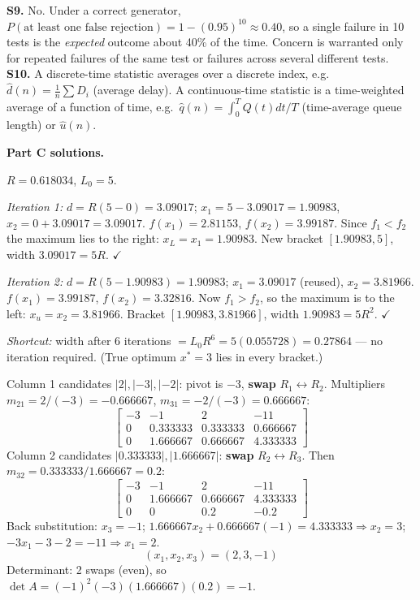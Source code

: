 \begin{qabox}
\textbf{S9.} No. Under a correct generator, $P(\text{at least one false rejection}) = 1-(0.95)^{10} \approx 0.40$, so a single failure in 10 tests is the \emph{expected} outcome about 40\% of the time. Concern is warranted only for repeated failures of the same test or failures across several different tests.\\
\textbf{S10.} A discrete-time statistic averages over a discrete index, e.g.\ $\hat d(n)=\frac1n\sum D_i$ (average delay). A continuous-time statistic is a time-weighted average of a function of time, e.g.\ $\hat q(n)=\int_0^T Q(t)dt / T$ (time-average queue length) or $\hat u(n)$.
\end{qabox}

\begin{probbox}
\textbf{Part C solutions.}

 $R=0.618034$, $L_0=5$.

\emph{Iteration 1:} $d = R(5-0) = 3.09017$; $x_1 = 5-3.09017 = 1.90983$, $x_2 = 0+3.09017 = 3.09017$.
$f(x_1) = 2.81153$, $f(x_2) = 3.99187$. Since $f_1 < f_2$ the maximum lies to the right: $x_L = x_1 = 1.90983$. New bracket $[1.90983, 5]$, width $3.09017 = 5R$. $\checkmark$

\emph{Iteration 2:} $d = R(5-1.90983) = 1.90983$; $x_1 = 3.09017$ (reused), $x_2 = 3.81966$.
$f(x_1) = 3.99187$, $f(x_2) = 3.32816$. Now $f_1 > f_2$, so the maximum is to the left: $x_u = x_2 = 3.81966$. Bracket $[1.90983, 3.81966]$, width $1.90983 = 5R^2$. $\checkmark$

\emph{Shortcut:} width after 6 iterations $= L_0R^6 = 5(0.055728) = \boxed{0.27864}$ --- no iteration required. (True optimum $x^*=3$ lies in every bracket.)

 Column 1 candidates $|2|,|-3|,|-2|$: pivot is $-3$, \textbf{swap} $R_1\leftrightarrow R_2$.
Multipliers $m_{21} = 2/(-3) = -0.666667$, $m_{31} = -2/(-3) = 0.666667$:
\[
\begin{bmatrix}-3&-1&2&-11\\0&0.333333&0.333333&0.666667\\0&1.666667&0.666667&4.333333\end{bmatrix}
\]
Column 2 candidates $|0.333333|, |1.666667|$: \textbf{swap} $R_2\leftrightarrow R_3$. Then $m_{32} = 0.333333/1.666667 = 0.2$:
\[
\begin{bmatrix}-3&-1&2&-11\\0&1.666667&0.666667&4.333333\\0&0&0.2&-0.2\end{bmatrix}
\]
Back substitution: $x_3 = -1$; $1.666667x_2 + 0.666667(-1) = 4.333333 \Rightarrow x_2 = 3$; $-3x_1 - 3 - 2 = -11 \Rightarrow x_1 = 2$.
\[
(x_1,x_2,x_3) = (2, 3, -1)
\]
Determinant: 2 swaps (even), so $\det A = (-1)^2(-3)(1.666667)(0.2) = -1$.


\end{probbox}
